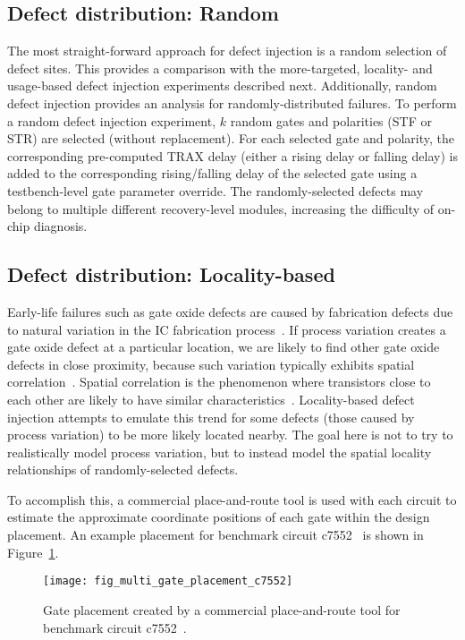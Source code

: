 \subsection{Defect distribution: Random}
The most straight-forward approach for defect injection is a random selection of defect sites.
%
This provides a comparison with the more-targeted, locality- and usage-based defect injection experiments described next.
%
Additionally, random defect injection provides an analysis for randomly-distributed failures.
%
To perform a random defect injection experiment, $k$ random gates and polarities (STF or STR) are selected (without replacement).
%
For each selected gate and polarity, the corresponding pre-computed TRAX delay (either a rising delay or falling delay) is added to the corresponding rising/falling delay of the selected gate using a testbench-level gate parameter override.
%
The randomly-selected defects may belong to multiple different recovery-level modules, increasing the difficulty of on-chip diagnosis.

\subsection{Defect distribution: Locality-based}
Early-life failures such as gate oxide defects are caused by fabrication defects due to natural variation in the IC fabrication process~\cite{chen08}.
%
If process variation creates a gate oxide defect at a particular location, we are likely to find other gate oxide defects in close proximity, because such variation typically exhibits spatial correlation~\cite{agarwal03}.
%
Spatial correlation is the phenomenon where transistors close to each other are likely to have similar characteristics~\cite{xiong07}.
%
Locality-based defect injection attempts to emulate this trend for some defects (those caused by process variation) to be more likely located nearby.
%
The goal here is not to try to realistically model process variation, but to instead model the spatial locality relationships of randomly-selected defects.

To accomplish this, a commercial place-and-route tool is used with each circuit to estimate the approximate coordinate positions of each gate within the design placement.
%
An example placement for benchmark circuit c7552~\cite{brglez85} is shown in Figure~\ref{fig:multi_gate_placement_c7552}.

\begin{figure}[hbtp]
\centering
\texttt{[image: fig\_multi\_gate\_placement\_c7552]}
\caption{Gate placement created by a commercial place-and-route tool for benchmark circuit c7552~\cite{brglez85}.}
\label{fig:multi_gate_placement_c7552}
\end{figure}


